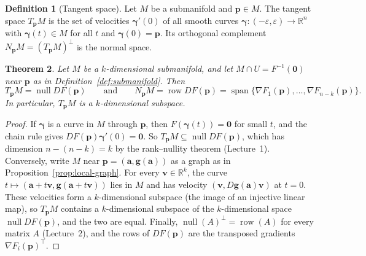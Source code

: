 \documentclass[11pt]{article}
\theoremstyle{definition}
\newtheorem{definition}{Definition}[section]
\theoremstyle{plain}
\newtheorem{theorem}[definition]{Theorem}
\theoremstyle{remark}
\DeclareMathOperator{\Null}{null}
\DeclareMathOperator{\row}{row}
\DeclareMathOperator{\Span}{span}
\begin{document}
\begin{definition}[Tangent space]\label{def:tangent}
    Let $M$ be a submanifold and $\mathbf{p} \in M$. The tangent space $T_{\mathbf{p}}M$ is the set of velocities $\boldsymbol{\gamma}'(0)$ of all smooth curves $\boldsymbol{\gamma}: (-\varepsilon, \varepsilon) \to \mathbb{R}^n$ with $\boldsymbol{\gamma}(t) \in M$ for all $t$ and $\boldsymbol{\gamma}(0) = \mathbf{p}$. Its orthogonal complement $N_{\mathbf{p}}M = (T_{\mathbf{p}}M)^\perp$ is the normal space.
\end{definition}

\begin{theorem}\label{thm:tangent-space}
    Let $M$ be a $k$-dimensional submanifold, and let $M \cap U = F^{-1}(\mathbf{0})$ near $\mathbf{p}$ as in Definition~\ref{def:submanifold}. Then
    \[T_{\mathbf{p}}M = \Null DF(\mathbf{p}) \qquad \text{and} \qquad N_{\mathbf{p}}M = \row DF(\mathbf{p}) = \Span\{\nabla F_1(\mathbf{p}), \ldots, \nabla F_{n-k}(\mathbf{p})\}.\]
    In particular, $T_{\mathbf{p}}M$ is a $k$-dimensional subspace.
\end{theorem}

\begin{proof}
    If $\boldsymbol{\gamma}$ is a curve in $M$ through $\mathbf{p}$, then $F(\boldsymbol{\gamma}(t)) = \mathbf{0}$ for small $t$, and the chain rule gives $DF(\mathbf{p})\boldsymbol{\gamma}'(0) = \mathbf{0}$. So $T_{\mathbf{p}}M \subseteq \Null DF(\mathbf{p})$, which has dimension $n - (n - k) = k$ by the rank--nullity theorem (Lecture~1). Conversely, write $M$ near $\mathbf{p} = (\mathbf{a}, \mathbf{g}(\mathbf{a}))$ as a graph as in Proposition~\ref{prop:local-graph}. For every $\mathbf{v} \in \mathbb{R}^k$, the curve $t \mapsto (\mathbf{a} + t\mathbf{v}, \mathbf{g}(\mathbf{a} + t\mathbf{v}))$ lies in $M$ and has velocity $(\mathbf{v}, D\mathbf{g}(\mathbf{a})\mathbf{v})$ at $t = 0$. These velocities form a $k$-dimensional subspace (the image of an injective linear map), so $T_{\mathbf{p}}M$ contains a $k$-dimensional subspace of the $k$-dimensional space $\Null DF(\mathbf{p})$, and the two are equal. Finally, $\Null(A)^\perp = \row(A)$ for every matrix $A$ (Lecture~2), and the rows of $DF(\mathbf{p})$ are the transposed gradients $\nabla F_i(\mathbf{p})^\top$.
\end{proof}
\end{document}
